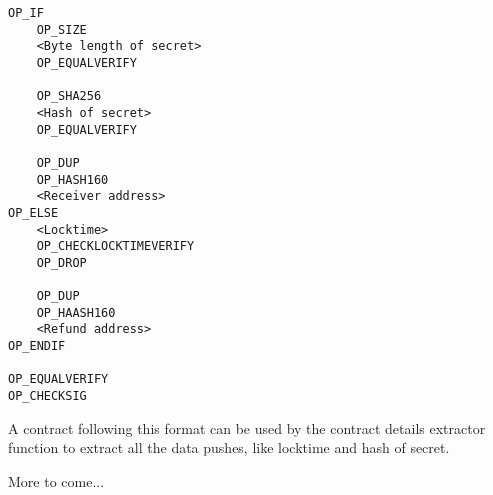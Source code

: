 \begin{verbatim}
OP_IF
    OP_SIZE
    <Byte length of secret>
    OP_EQUALVERIFY
    
    OP_SHA256
    <Hash of secret>
    OP_EQUALVERIFY
    
    OP_DUP
    OP_HASH160
    <Receiver address>
OP_ELSE
    <Locktime>
    OP_CHECKLOCKTIMEVERIFY
    OP_DROP
    
    OP_DUP
    OP_HAASH160
    <Refund address>
OP_ENDIF

OP_EQUALVERIFY
OP_CHECKSIG
\end{verbatim}

A contract following this format can be used by the contract details 
extractor function to extract all the data pushes, like locktime and 
hash of secret.

\vspace{20mm}
More to come...